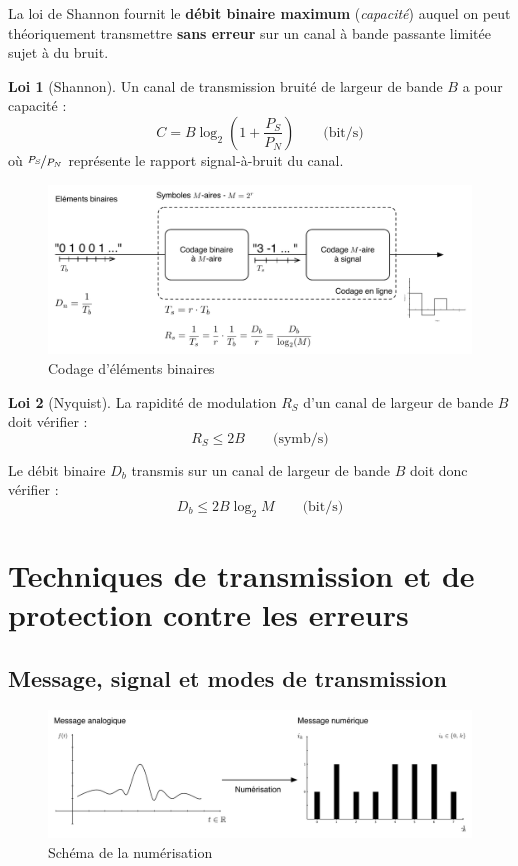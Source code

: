 \documentclass[11pt,english,french]{scrreprt}
\theoremstyle{remark}
\theoremstyle{definition}
\newtheorem*{loi*}{Loi}
\begin{document}
La loi de Shannon fournit le \textbf{débit binaire maximum} (\emph{capacité}) auquel on peut théoriquement transmettre \textbf{sans erreur} sur un canal à bande passante limitée sujet à du bruit.

\begin{loi*}[Shannon]
	Un canal de transmission bruité de largeur de bande $B$ a pour capacité :
	\[
		C=B\log_2\left(1+\frac{P_S}{P_N}\right) \qquad \textrm{(bit/s)}
	\] où $\nicefrac{P_S}{P_N}$ représente le rapport signal-à-bruit du canal.
\end{loi*}

\begin{figure}[h!]
	\center
	\includegraphics[scale=.75]{graphes/codage}
	\caption{Codage d'éléments binaires}
\end{figure}

\begin{loi*}[Nyquist]
	La rapidité de modulation $R_S$ d'un canal de largeur de bande $B$ doit vérifier :
	\[
		R_S \leqslant 2B \qquad \textrm{(symb/s)}
	\]
	
	Le débit binaire $D_b$ transmis sur un canal de largeur de bande $B$ doit donc vérifier :
	\[
		D_b \leqslant 2B\log_2 M \qquad \textrm{(bit/s)}
	\]
\end{loi*}

\chapter{Techniques de transmission et de protection contre les erreurs}

\section{Message, signal et modes de transmission} %

\begin{figure}[h!]
	\center
	\includegraphics[scale=.75]{graphes/numerisation}
	\caption{Schéma de la numérisation}
\end{figure}
\end{document}
